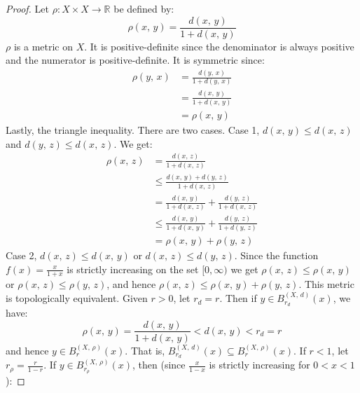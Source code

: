 \documentclass{article}
\theoremstyle{plain}
\theoremstyle{normal}
\begin{document}
        \begin{proof}
            Let $\rho:X\times{X}\rightarrow\mathbb{R}$ be defined by:
            \begin{equation}
                \rho(x,\,y)=\frac{d(x,\,y)}{1+d(x,\,y)}
            \end{equation}
            $\rho$ is a metric on $X$. It is positive-definite since the
            denominator is always positive and the numerator is
            positive-definite. It is symmetric since:
            \begin{align}
                \rho(y,\,x)&=\frac{d(y,\,x)}{1+d(y,\,x)}\\
                    &=\frac{d(x,\,y)}{1+d(x,\,y)}\\
                    &=\rho(x,\,y)
            \end{align}
            Lastly, the triangle inequality. There are two cases.
            Case 1, $d(x,\,y)\leq{d}(x,\,z)$ and
            $d(y,\,z)\leq{d}(x,\,z)$. We get:
            \begin{align}
                \rho(x,\,z)&=\frac{d(x,\,z)}{1+d(x,\,z)}\\
                &\leq\frac{d(x,\,y)+d(y,\,z)}{1+d(x,\,z)}\\
                &=\frac{d(x,\,y)}{1+d(x,\,z)}+
                    \frac{d(y,\,z)}{1+d(x,\,z)}\\
                &\leq\frac{d(x,\,y)}{1+d(x,\,y)}+\frac{d(y,\,z)}{1+d(y,\,z)}\\
                &=\rho(x,\,y)+\rho(y,\,z)
            \end{align}
            Case 2, $d(x,\,z)\leq{d}(x,\,y)$ or $d(x,\,z)\leq{d}(y,\,z)$.
            Since the function $f(x)=\frac{x}{1+x}$ is strictly increasing
            on the set $[0,\infty)$ we get $\rho(x,\,z)\leq\rho(x,\,y)$ or
            $\rho(x,\,z)\leq\rho(y,\,z)$, and hence
            $\rho(x,\,z)\leq\rho(x,\,y)+\rho(y,\,z)$. This metric is
            topologically equivalent. Given $r>0$, let
            $r_{d}=r$. Then if $y\in{B}_{r_{d}}^{(X,\,d)}(x)$, we have:
            \begin{equation}
                \rho(x,\,y)=\frac{d(x,\,y)}{1+d(x,\,y)}<d(x,\,y)<r_{d}=r
            \end{equation}
            and hence $y\in{B}_{r}^{(X,\,\rho)}(x)$. That is,
            $B_{r_{d}}^{(X,\,d)}(x)\subseteq{B}_{r}^{(X,\,\rho)}(x)$. If $r<1$,
            let $r_{\rho}=\frac{r}{1-r}$.
            If $y\in{B}_{r_{\rho}}^{(X,\,\rho)}(x)$, then
            (since $\frac{x}{1-x}$ is strictly increasing for $0<x<1$):

\end{proof}
\end{document}
